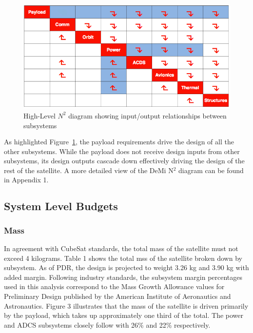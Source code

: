 \documentclass[12pt]{article}
\begin{document}
		\begin{figure}[!ht]
				\centering
				\includegraphics[width=5in]{images/MissionOverview_2.png}
				\caption{High-Level $N^2$ diagram showing input/output relationships between subsystems}
				\label{fig:Mission_N2}
			\end{figure}
			
		As highlighted Figure~\ref{fig:Mission_N2}, the payload requirements drive the design of all the other subsystems. While the payload does not receive design inputs from other subsystems, its design outputs cascade down effectively driving the design of the rest of the satellite. A more detailed view of the DeMi N$^2$ diagram can be found in Appendix 1.
	
	\subsection{System Level Budgets}
		\subsubsection{Mass}
		In agreement with CubeSat standards, the total mass of the satellite must not exceed 4 kilograms. Table 1 shows the total mss of the satellite broken down by subsystem. As of PDR, the design is projected to weight 3.26 kg and 3.90 kg with added margin. Following industry standards, the subsystem margin percentages used in this analysis correspond to the Mass Growth Allowance values for Preliminary Design published by the American Institute of Aeronautics and Astronautics. Figure 3 illustrates that the mass of the satellite is driven primarily by the payload, which takes up approximately one third of the total. The power and ADCS subsystems closely follow with 26\% and 22\% respectively. 
		
\end{document}
